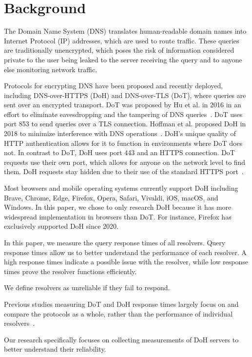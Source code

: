 \section{Background}\label{sec:back}

The Domain Name System (DNS) translates human-readable domain names into Internet Protocol (IP) addresses, which are used to route traffic. 
These queries are traditionally unencrypted, which poses the risk of information considered private to the user being leaked to the server receiving the query and to anyone else monitoring network traffic.

Protocols for encrypting DNS have been proposed and recently deployed, including DNS-over-HTTPS (DoH) and DNS-over-TLS (DoT), where queries are sent over an encrypted transport.
DoT was proposed by Hu et al. in 2016 in an effort to eliminate eavesdropping and the tampering of DNS queries~\cite{https://datatracker.ietf.org/doc/html/draft-hoffman-dns-over-https-01}. 
DoT uses port 853 to send queries over a TLS connection. 
Hoffman et al. proposed DoH in 2018 to minimize interference with DNS operations~\cite{https://datatracker.ietf.org/doc/html/rfc7858}. 
DoH's unique quality of HTTP authentication allows for it to function in environments where DoT does not. 
In contrast to DoT, DoH uses port 443 and an HTTPS connection. 
DoT requests use their own port, which allows for anyone on the network level to find them. 
DoH requests stay hidden due to their use of the standard HTTPS port~\cite{https://aboutssl.org/dns-over-tls-vs-dns-over-https/}. 

Most browsers and mobile operating systems currently support DoH including Brave, Chrome, Edge, Firefox, Opera, Safari, Vivaldi, iOS, macOS, and Windows. 
In this paper, we chose to only research DoH because it has more widespread implementation in browsers than DoT.
For instance, Firefox has exclusively supported DoH since 2020. 

In this paper, we measure the query response times of all resolvers. 
Query response times allow us to better understand the performance of each resolver. 
A high response times indicate a possible issue with the resolver, while low response times prove the resolver functions efficiently. 

We define resolvers as unreliable if they fail to respond.  

Previous studies measuring DoT and DoH response times largely focus on and compare the protocols as a whole, rather than the performance of individual resolvers~\cite{https://www.liubaojun.org/files/paper/IMC-2019.pdf, https://arxiv.org/abs/1907.08089}.

Our research specifically focuses on collecting measurements of DoH servers to better understand their reliability. 

